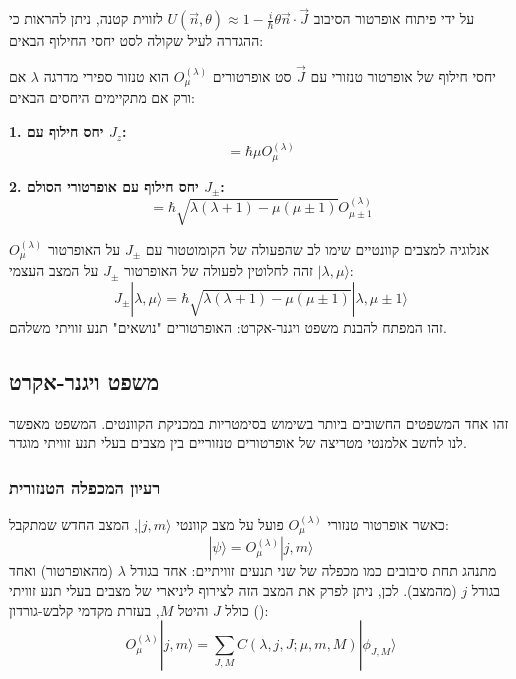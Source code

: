 על ידי פיתוח אופרטור הסיבוב $U(\vec{n}, \theta) \approx 1 - \frac{i}{\hbar}\theta \vec{n}\cdot\vec{J}$ לזווית קטנה, ניתן להראות כי ההגדרה לעיל שקולה לסט יחסי החילוף הבאים:

\begin{theorembox}{יחסי חילוף של אופרטור טנזורי עם $\vec{J}$}
סט אופרטורים $O_\mu^{(\lambda)}$ הוא טנזור ספירי מדרגה $\lambda$ אם ורק אם מתקיימים היחסים הבאים:

\textbf{1. יחס חילוף עם $J_z$:}
\begin{equation}
    [J_z, O_\mu^{(\lambda)}] = \hbar \mu O_\mu^{(\lambda)}
\end{equation}

\textbf{2. יחס חילוף עם אופרטורי הסולם $J_\pm$:}
\begin{equation}
    [J_\pm, O_\mu^{(\lambda)}] = \hbar \sqrt{\lambda(\lambda+1) - \mu(\mu \pm 1)} O_{\mu \pm 1}^{(\lambda)}
\end{equation}
\end{theorembox}

\begin{notebox}{אנלוגיה למצבים קוונטיים}
שימו לב שהפעולה של הקומוטטור עם $J_\pm$ על האופרטור $O_\mu^{(\lambda)}$ זהה לחלוטין לפעולה של האופרטור $J_\pm$ על המצב העצמי $|\lambda, \mu\rangle$:
\[
J_\pm |\lambda, \mu\rangle = \hbar \sqrt{\lambda(\lambda+1) - \mu(\mu \pm 1)} |\lambda, \mu \pm 1\rangle
\]
זהו המפתח להבנת משפט ויגנר-אקרט: האופרטורים "נושאים" תנע זוויתי משלהם.
\end{notebox}

\subsection{משפט ויגנר-אקרט }
זהו אחד המשפטים החשובים ביותר בשימוש בסימטריות במכניקת הקוונטים. המשפט מאפשר לנו לחשב אלמנטי מטריצה של אופרטורים טנזוריים בין מצבים בעלי תנע זוויתי מוגדר.

\subsubsection{רעיון המכפלה הטנזורית}
כאשר אופרטור טנזורי $O_\mu^{(\lambda)}$ פועל על מצב קוונטי $|j, m\rangle$, המצב החדש שמתקבל:
\[
|\psi\rangle = O_\mu^{(\lambda)} |j, m\rangle
\]
מתנהג תחת סיבובים כמו מכפלה של שני תנעים זוויתיים: אחד בגודל $\lambda$ (מהאופרטור) ואחד בגודל $j$ (מהמצב).
לכן, ניתן לפרק את המצב הזה לצירוף ליניארי של מצבים בעלי תנע זוויתי כולל $J$ והיטל $M$, בעזרת מקדמי קלבש-גורדון ():
\[
O_\mu^{(\lambda)} |j, m\rangle = \sum_{J, M} C(\lambda, j, J; \mu, m, M) |\phi_{J, M}\rangle
\]

